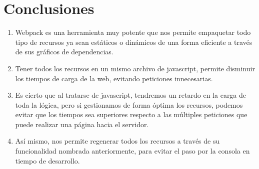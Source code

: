 \section{Conclusiones}
\begin{enumerate}
    \item Webpack es una herramienta muy potente que nos permite empaquetar todo tipo de recursos ya sean estáticos o dinámicos de una forma eficiente a través de sus gráficos de  dependencias. 
    \item Tener todos los recursos en un mismo archivo de javascript, permite disminuir los tiempos de carga de la web, evitando peticiones innecesarias. 
    \item Es cierto que al tratarse de javascript, tendremos un retardo en la carga de toda la lógica, pero si gestionamos de forma óptima los recursos, podemos evitar que los tiempos sea superiores respecto a las múltiples peticiones que puede realizar una página hacia el servidor. 
    \item Así mismo, nos permite regenerar todos los recursos a través de su funcionalidad nombrada anteriormente, para evitar el paso por la consola en tiempo de desarrollo.
\end{enumerate}

